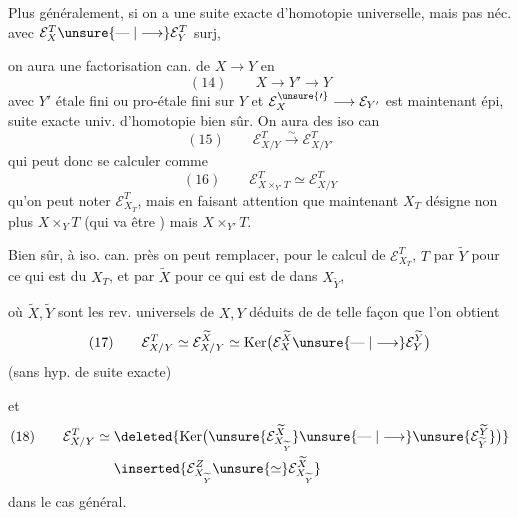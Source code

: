Plus généralement, si on a une suite exacte d'homotopie universelle, mais pas néc. avec $\mathcal E_X^T\unsure{\mathrel{\text{---}}|\longrightarrow}\mathcal E_Y^T$ surj,



on aura une factorisation can. de $X\longrightarrow Y$ en
\[
(14)\qquad X\longrightarrow Y'\longrightarrow Y
\]
avec $Y'$ étale fini ou pro-étale fini sur $Y$ et $\mathcal E_X^{\unsure{\prime}}\longrightarrow\mathcal E_{Y'}$ est maintenant épi,   suite exacte univ. d'homotopie bien sûr. On aura des iso can
\[
(15)\qquad \mathcal E_{X/Y}^T\xrightarrow{\sim}\mathcal E_{X/Y'}^T
\]
qui peut donc se calculer comme
\[
(16)\qquad \mathcal E_{X\times_{Y'}T}^T\simeq\mathcal E_{X/Y}^T
\]
qu'on peut noter $\mathcal E_{X_T}^T$, mais en faisant attention que maintenant $X_T$ désigne non plus $X\times_YT$ (qui va être  ) mais $X\times_{Y'}T$.

Bien sûr, à iso. can. près on peut  remplacer, pour le calcul de $\mathcal E_{X_T}^T$, $T$ par $\widetilde Y$ pour ce qui est du $X_T$, et par $\widetilde X$ pour ce qui est de  dans $X_{\widetilde Y}$,


où $\widetilde X,\widetilde Y$ sont les rev. universels de $X,Y$ déduits de  de telle façon que l'on obtient
\[
(17)\qquad \mathcal E_{X/Y}^T\simeq\mathcal E_{X/Y}^{\widetilde X}\simeq\operatorname{Ker}\bigl(\mathcal E_X^{\widetilde X}\unsure{\mathrel{\text{---}}|\longrightarrow}\mathcal E_Y^{\widetilde Y}\bigr)
\]
(sans hyp. de suite exacte)

et
\[
\begin{aligned}
(18)\qquad \mathcal E_{X/Y}^T\simeq{}&\deleted{\operatorname{Ker}\bigl(\unsure{\mathcal E_{X_{\widetilde Y}}^{\widetilde X}}\unsure{\mathrel{\text{---}}|\longrightarrow}\unsure{\mathcal E_{\widetilde Y}^{\widetilde Y}}\bigr)}\\
&\inserted{\mathcal E_{X_{\widetilde Y}}^Z\unsure{\simeq}\mathcal E_{X_{\widetilde Y}}^{\widetilde X}}
\end{aligned}
\]
dans le cas général.


